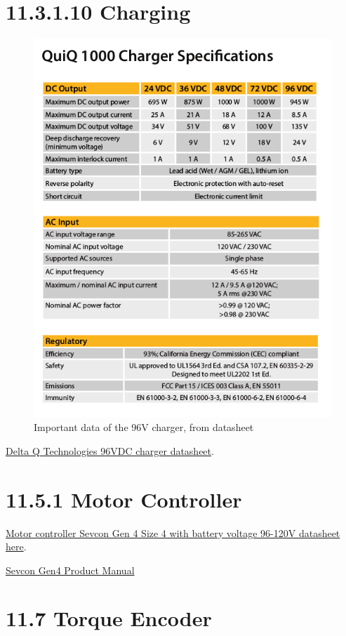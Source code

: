 \documentclass{article}
\begin{document}
\section*{11.3.1.10 Charging}

\begin{figure}[H]
    \centering
    \includegraphics[width = 0.8 \textwidth]{chargerdata}
    \caption{Important data of the 96V charger, from datasheet}
    \label{chargerdatasheet}
\end{figure}

\href{http://delta-q.com/wp-content/uploads/2015/12/Delta-Q_QuiQ1000_BatteryCharger_Specifications.pdf}{Delta Q Technologies 96VDC charger datasheet}.

\section*{11.5.1 Motor Controller}

\href{http://www.sevcon.com/media/2461/Gen4\%20Aug\%202013\%20web.pdf}{Motor controller Sevcon Gen 4 Size 4 with battery voltage 96-120V datasheet here}.

\href{http://www.thunderstruck-ev.com/Manuals/Gen4_Product_Manual_V3.0.pdf}{Sevcon Gen4 Product Manual}

\section*{11.7 Torque Encoder} \label{torqueappendix}
\end{document}
